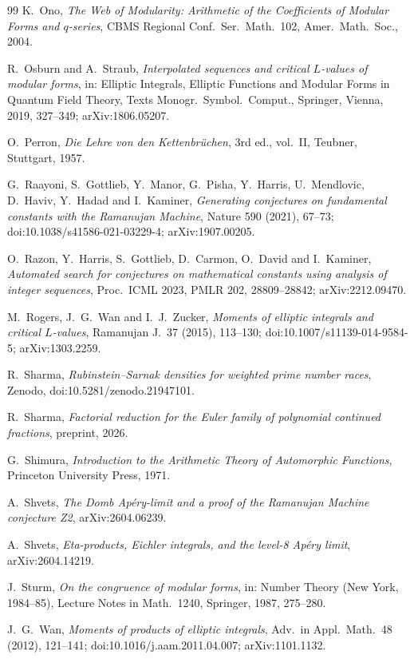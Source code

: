 \documentclass[11pt]{amsart}
\theoremstyle{definition}
\theoremstyle{remark}
\numberwithin{equation}{section}
\begin{document}
\begin{thebibliography}{99}
 K.~Ono, \emph{The Web of Modularity: Arithmetic of the Coefficients of Modular Forms and $q$-series}, CBMS Regional Conf.\ Ser.\ Math.\ 102, Amer.\ Math.\ Soc., 2004.

 R.~Osburn and A.~Straub, \emph{Interpolated sequences and critical $L$-values of modular forms}, in: Elliptic Integrals, Elliptic Functions and Modular Forms in Quantum Field Theory, Texts Monogr.\ Symbol.\ Comput., Springer, Vienna, 2019, 327--349; arXiv:1806.05207.

 O.~Perron, \emph{Die Lehre von den Kettenbr\"uchen}, 3rd ed., vol.~II, Teubner, Stuttgart, 1957.

 G.~Raayoni, S.~Gottlieb, Y.~Manor, G.~Pisha, Y.~Harris, U.~Mendlovic, D.~Haviv, Y.~Hadad and I.~Kaminer, \emph{Generating conjectures on fundamental constants with the Ramanujan Machine}, Nature 590 (2021), 67--73; doi:10.1038/s41586-021-03229-4; arXiv:1907.00205.

 O.~Razon, Y.~Harris, S.~Gottlieb, D.~Carmon, O.~David and I.~Kaminer, \emph{Automated search for conjectures on mathematical constants using analysis of integer sequences}, Proc.\ ICML 2023, PMLR 202, 28809--28842; arXiv:2212.09470.

 M.~Rogers, J.~G.~Wan and I.~J.~Zucker, \emph{Moments of elliptic integrals and critical $L$-values}, Ramanujan J.\ 37 (2015), 113--130; doi:10.1007/s11139-014-9584-5; arXiv:1303.2259.

 R.~Sharma, \emph{Rubinstein--Sarnak densities for weighted prime number races}, Zenodo, doi:10.5281/zenodo.21947101.

 R.~Sharma, \emph{Factorial reduction for the Euler family of polynomial continued fractions}, preprint, 2026.

 G.~Shimura, \emph{Introduction to the Arithmetic Theory of Automorphic Functions}, Princeton University Press, 1971.

 A.~Shvets, \emph{The Domb Ap\'ery-limit and a proof of the Ramanujan Machine conjecture Z2}, arXiv:2604.06239.

 A.~Shvets, \emph{Eta-products, Eichler integrals, and the level-8 Ap\'ery limit}, arXiv:2604.14219.

 J.~Sturm, \emph{On the congruence of modular forms}, in: Number Theory (New York, 1984--85), Lecture Notes in Math.\ 1240, Springer, 1987, 275--280.

 J.~G.~Wan, \emph{Moments of products of elliptic integrals}, Adv.\ in Appl.\ Math.\ 48 (2012), 121--141; doi:10.1016/j.aam.2011.04.007; arXiv:1101.1132.


\end{thebibliography}
\end{document}
